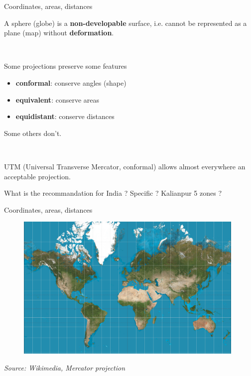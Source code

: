 \begin{frame}{Coordinates, areas, distances}

A sphere (globe) is a \textbf{non-developable} surface, i.e. cannot be represented as a plane (map) without \textbf{deformation}.

~

Some projections preserve some features  
\begin{itemize}
  \item \textbf{conformal}: conserve angles (shape)
  \item \textbf{equivalent}: conserve areas
  \item \textbf{equidistant}: conserve distances
\end{itemize}

Some others don't. 

~

UTM (Universal Transverse Mercator, conformal) allows almost everywhere an acceptable projection. 

What is the recommandation for India ? Specific ? Kalianpur 5 zones ? 

\end{frame}


\begin{frame}{Coordinates, areas, distances}

\begin{figure}
\includegraphics[width=11cm]{MercatorProj.jpg}
\end{figure}

\footnotesize
\emph{Source: Wikimedia, Mercator projection}
\normalsize

\end{frame}


